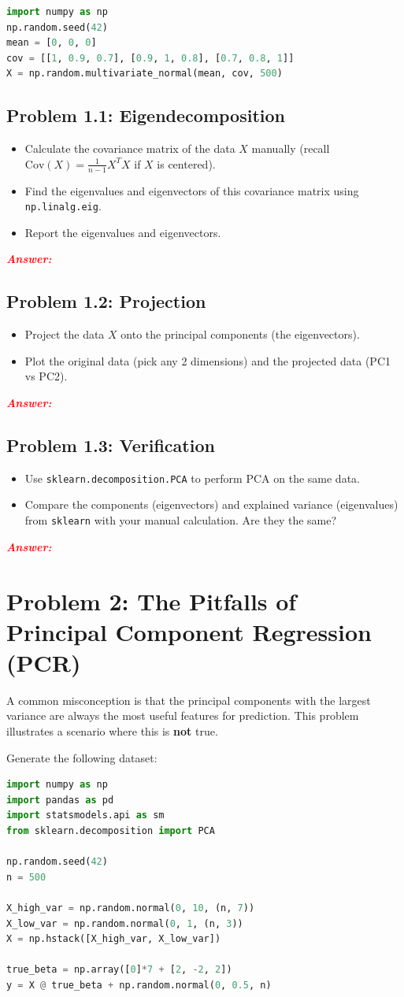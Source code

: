 \documentclass[11pt, letterpaper]{article}
\newcommand{\problem}[1]{\section*{Problem #1}}
\newcommand{\subproblem}[1]{\subsection*{Problem #1}}
\newcommand{\answer}{\textbf{\textit{\textcolor{red}{Answer:}}}}
\begin{document}
    \begin{lstlisting}[language=Python]
import numpy as np
np.random.seed(42)
mean = [0, 0, 0]
cov = [[1, 0.9, 0.7], [0.9, 1, 0.8], [0.7, 0.8, 1]]
X = np.random.multivariate_normal(mean, cov, 500)\end{lstlisting}

\subproblem{1.1: Eigendecomposition}
\begin{itemize}
    \item Calculate the covariance matrix of the data $X$ manually (recall $\text{Cov}(X) = \frac{1}{n-1}X^T X$ if $X$ is centered).
    \item Find the eigenvalues and eigenvectors of this covariance matrix using \texttt{np.linalg.eig}.
    \item Report the eigenvalues and eigenvectors.
\end{itemize}

\answer

\subproblem{1.2: Projection}
\begin{itemize}
    \item Project the data $X$ onto the principal components (the eigenvectors). 
    \item Plot the original data (pick any 2 dimensions) and the projected data (PC1 vs PC2).
\end{itemize}

\answer

\subproblem{1.3: Verification}
\begin{itemize}
    \item Use \texttt{sklearn.decomposition.PCA} to perform PCA on the same data.
    \item Compare the components (eigenvectors) and explained variance (eigenvalues) from \texttt{sklearn} with your manual calculation. Are they the same?
\end{itemize}

\answer

\problem{2: The Pitfalls of Principal Component Regression (PCR)}

A common misconception is that the principal components with the largest variance are always the most useful features for prediction. This problem illustrates a scenario where this is \textbf{not} true.

Generate the following dataset:

    \begin{lstlisting}[language=Python]
import numpy as np
import pandas as pd
import statsmodels.api as sm
from sklearn.decomposition import PCA

np.random.seed(42)
n = 500

X_high_var = np.random.normal(0, 10, (n, 7))
X_low_var = np.random.normal(0, 1, (n, 3))
X = np.hstack([X_high_var, X_low_var])

true_beta = np.array([0]*7 + [2, -2, 2])
y = X @ true_beta + np.random.normal(0, 0.5, n)\end{lstlisting}
\end{document}
